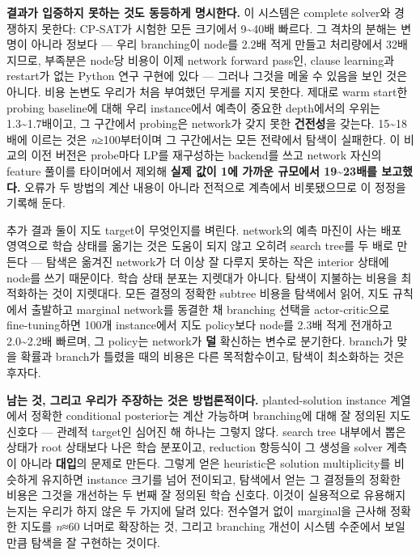 \documentclass[final,5p,twocolumn]{elsarticle}
\begin{document}
\textbf{결과가 입증하지 못하는 것도 동등하게 명시한다.} 이 시스템은 complete solver와 경쟁하지 못한다: CP-SAT가 시험한 모든 크기에서 9\textasciitilde{}40배 빠르다. 그 격차의 분해는 변명이 아니라 정보다 — 우리 branching이 node를 2.2배 적게 만들고 처리량에서 32배 지므로, 부족분은 node당 비용이 이제 network forward pass인, clause learning과 restart가 없는 Python 연구 구현에 있다 — 그러나 그것을 메울 수 있음을 보인 것은 아니다. 비용 논변도 우리가 처음 부여했던 무게를 지지 못한다. 제대로 warm start한 probing baseline에 대해 우리 instance에서 예측이 중요한 depth에서의 우위는 1.3\textasciitilde{}1.7배이고, 그 구간에서 probing은 network가 갖지 못한 \textbf{건전성}을 갖는다. 15\textasciitilde{}18배에 이르는 것은 \textit{n}≥100부터이며 그 구간에서는 모든 전략에서 탐색이 실패한다. 이 비교의 이전 버전은 probe마다 LP를 재구성하는 backend를 쓰고 network 자신의 feature 풀이를 타이머에서 제외해 \textbf{실제 값이 1에 가까운 규모에서 19\textasciitilde{}23배를 보고했다.} 오류가 두 방법의 계산 내용이 아니라 전적으로 계측에서 비롯됐으므로 이 정정을 기록해 둔다.

추가 결과 둘이 지도 target이 무엇인지를 벼린다. network의 예측 마진이 사는 배포 영역으로 학습 상태를 옮기는 것은 도움이 되지 않고 오히려 search tree를 두 배로 만든다 — 탐색은 옮겨진 network가 더 이상 잘 다루지 못하는 작은 interior 상태에 node를 쓰기 때문이다. 학습 상태 분포는 지렛대가 아니다. 탐색이 지불하는 비용을 최적화하는 것이 지렛대다. 모든 결정의 정확한 subtree 비용을 탐색에서 읽어, 지도 규칙에서 출발하고 marginal network를 동결한 채 branching 선택을 actor-critic으로 fine-tuning하면 100개 instance에서 지도 policy보다 node를 2.3배 적게 전개하고 2.0\textasciitilde{}2.2배 빠르며, 그 policy는 network가 \textbf{덜} 확신하는 변수로 분기한다. branch가 맞을 확률과 branch가 틀렸을 때의 비용은 다른 목적함수이고, 탐색이 최소화하는 것은 후자다.

\textbf{남는 것, 그리고 우리가 주장하는 것은 방법론적이다.} planted-solution instance 계열에서 정확한 conditional posterior는 계산 가능하며 branching에 대해 잘 정의된 지도 신호다 — 관례적 target인 심어진 해 하나는 그렇지 않다. search tree 내부에서 뽑은 상태가 root 상태보다 나은 학습 분포이고, reduction 항등식이 그 생성을 solver 계측이 아니라 \textbf{대입}의 문제로 만든다. 그렇게 얻은 heuristic은 solution multiplicity를 비슷하게 유지하면 instance 크기를 넘어 전이되고, 탐색에서 얻는 그 결정들의 정확한 비용은 그것을 개선하는 두 번째 잘 정의된 학습 신호다. 이것이 실용적으로 유용해지는지는 우리가 하지 않은 두 가지에 달려 있다: 전수열거 없이 marginal을 근사해 정확한 지도를 \textit{n}≈60 너머로 확장하는 것, 그리고 branching 개선이 시스템 수준에서 보일 만큼 탐색을 잘 구현하는 것이다.
\end{document}
